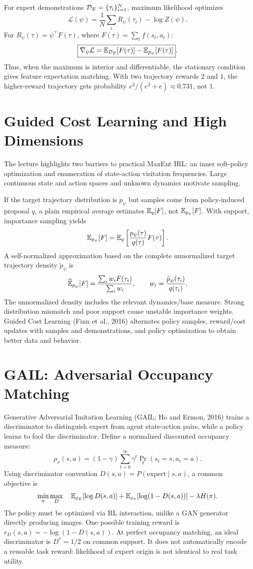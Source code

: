 For expert demonstrations $\mathcal{D}_E=\{\tau_i\}_{i=1}^N$, maximum likelihood optimizes
\[
\mathcal L(\psi)=\frac1N\sum_i R_\psi(\tau_i)-\log Z(\psi).
\]
For $R_\psi(\tau)=\psi^\top F(\tau)$, where $F(\tau)=\sum_t f(s_t,a_t)$:
\[
\boxed{\nabla_\psi\mathcal L=\mathbb{E}_{\mathcal{D}_E}[F(\tau)]-\mathbb{E}_{p_\psi}[F(\tau)]}.
\]
Thus, when the maximum is interior and differentiable, the stationary condition gives feature expectation matching. With two trajectory rewards $2$ and $1$, the higher-reward trajectory gets probability $e^2/(e^2+e)\approx 0.731$, not $1$.

\section{Guided Cost Learning and High Dimensions}
The lecture highlights two barriers to practical MaxEnt IRL: an inner soft-policy optimization and enumeration of state-action visitation frequencies. Large continuous state and action spaces and unknown dynamics motivate sampling.

If the target trajectory distribution is $p_\psi$ but samples come from policy-induced proposal $q$, a plain empirical average estimates $\mathbb{E}_q[F]$, not $\mathbb{E}_{p_\psi}[F]$. With support, importance sampling yields
\[
\mathbb{E}_{p_\psi}[F]=\mathbb{E}_q\left[\frac{p_\psi(\tau)}{q(\tau)}F(\tau)\right].
\]
A self-normalized approximation based on the complete unnormalized target trajectory density $\widetilde p_\psi$ is
\[
\widehat{\mathbb{E}}_{p_\psi}[F]=\frac{\sum_iw_iF(\tau_i)}{\sum_iw_i},
\qquad w_i=\frac{\widetilde p_\psi(\tau_i)}{q(\tau_i)}.
\]
The unnormalized density includes the relevant dynamics/base measure. Strong distribution mismatch and poor support cause unstable importance weights.
Guided Cost Learning (Finn et al., 2016) alternates policy samples, reward/cost updates with samples and demonstrations, and policy optimization to obtain better data and behavior.

\section{GAIL: Adversarial Occupancy Matching}
Generative Adversarial Imitation Learning (GAIL; Ho and Ermon, 2016) trains a discriminator to distinguish expert from agent state-action pairs, while a policy learns to fool the discriminator. Define a normalized discounted occupancy measure:
\[
\rho_\pi(s,a)=(1-\gamma)\sum_{t=0}^{\infty}
\gamma^t\Pr_\pi(s_t=s,a_t=a).
\]
Using discriminator convention $D(s,a)=P(\mathrm{expert}\mid s,a)$, a common objective is
\[
\min_\pi\max_D\quad
\mathbb{E}_{\rho_E}[\log D(s,a)]
+\mathbb{E}_{\rho_\pi}[\log(1-D(s,a))]-\lambda H(\pi).
\]
The policy must be optimized via RL interaction, unlike a GAN generator directly producing images. One possible training reward is $r_D(s,a)=-\log(1-D(s,a))$.
At perfect occupancy matching, an ideal discriminator is $D^*=1/2$ on common support. It does not automatically encode a reusable task reward: likelihood of expert origin is not identical to real task utility.

